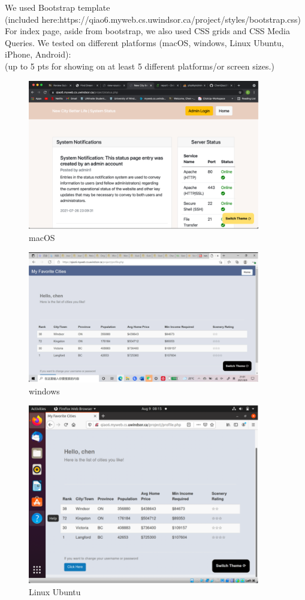 \documentclass[12pt, letterpaper]{article}
\begin{document}
We used Bootstrap template \\(included here:https://qiao6.myweb.cs.uwindsor.ca/project/styles/bootstrap.css) 
\\For index page, aside from bootstrap, we also used CSS grids and CSS Media Queries. 
We tested on different platforms (macOS, windows, Linux Ubuntu, iPhone, Android):
\\(up to 5 pts for showing on at least 5 different platforms/or screen sizes.)

\begin{figure}[htbp]
	\centering
	\includegraphics[width=4in]{images/q12-macOS.png}
	\caption{macOS}
 \end{figure}
 
 \begin{figure}[htbp]
	\centering
	\includegraphics[width=4in]{images/q12-windows.png}
	\caption{windows}
 \end{figure}

 \newpage
 
 \begin{figure}[htbp]
	\centering
	\includegraphics[width=4in]{images/q12linuxUbuntu.png}
	\caption{Linux Ubuntu}
 \end{figure}
 
\end{document}
